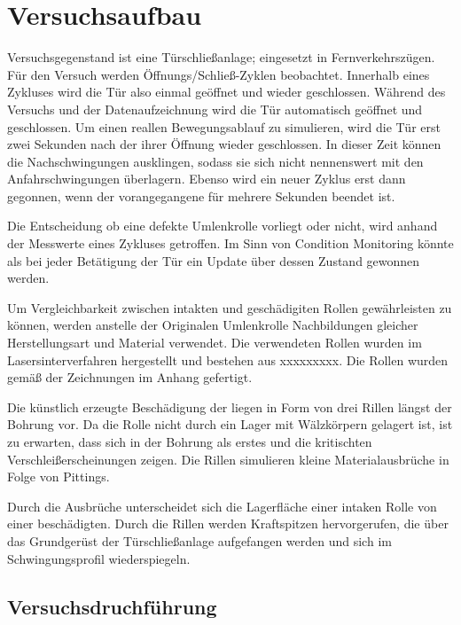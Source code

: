 \chapter{Versuchsaufbau}
\label{ch:versuchsaufbau}

Versuchsgegenstand ist eine Türschließanlage; eingesetzt in Fernverkehrszügen. Für den Versuch werden Öffnungs/Schließ-Zyklen beobachtet. Innerhalb eines Zykluses wird die Tür also einmal geöffnet und wieder geschlossen. Während des Versuchs und der Datenaufzeichnung wird die Tür automatisch geöffnet und geschlossen. Um einen reallen Bewegungsablauf zu simulieren, wird die Tür erst zwei Sekunden nach der ihrer Öffnung wieder geschlossen. In dieser Zeit können die Nachschwingungen ausklingen, sodass sie sich nicht nennenswert mit den Anfahrschwingungen überlagern. Ebenso wird ein neuer Zyklus erst dann gegonnen, wenn der vorangegangene für mehrere Sekunden beendet ist. 

Die Entscheidung ob eine defekte Umlenkrolle vorliegt oder nicht, wird anhand der Messwerte eines Zykluses getroffen. Im Sinn von Condition Monitoring könnte als bei jeder Betätigung der Tür ein Update über dessen Zustand gewonnen werden.

Um Vergleichbarkeit zwischen intakten und geschädigiten Rollen gewährleisten zu können, werden anstelle der Originalen Umlenkrolle Nachbildungen gleicher Herstellungsart und Material verwendet.  Die verwendeten Rollen wurden im Lasersinterverfahren hergestellt und bestehen aus xxxxxxxxx. Die Rollen wurden gemäß der Zeichnungen im Anhang gefertigt.

Die künstlich erzeugte Beschädigung der liegen in Form von drei Rillen längst der Bohrung vor. Da die Rolle nicht durch ein Lager mit Wälzkörpern gelagert ist, ist zu erwarten, dass sich in der Bohrung als erstes und die kritischten Verschleißerscheinungen zeigen. Die Rillen simulieren kleine Materialausbrüche in Folge von Pittings.

Durch die Ausbrüche unterscheidet sich die Lagerfläche einer intaken Rolle von einer beschädigten. Durch die Rillen werden Kraftspitzen hervorgerufen, die über das Grundgerüst der Türschließanlage aufgefangen werden und sich im Schwingungsprofil wiederspiegeln.

\section{Versuchsdruchführung}
\label{sec:versuchsdurchfuehrung}

